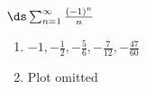 {$\ds \sum_{n=1}^\infty \frac{(-1)^n}{n}$
}
{\begin{enumerate}
\item	$-1,-\frac{1}{2},-\frac{5}{6},-\frac{7}{12},-\frac{47}{60}$
\item	Plot omitted
\end{enumerate}
}
